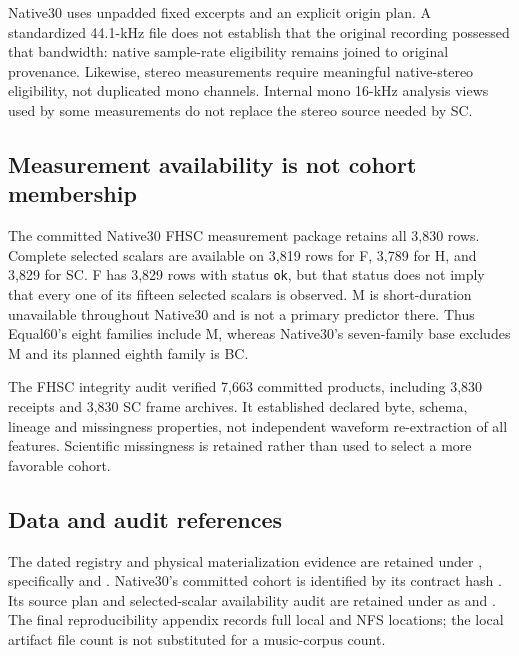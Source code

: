 Native30 uses unpadded fixed excerpts and an explicit origin plan. A standardized
44.1-kHz file does not establish that the original recording possessed that
bandwidth: native sample-rate eligibility remains joined to original provenance.
Likewise, stereo measurements require meaningful native-stereo eligibility,
not duplicated mono channels. Internal mono 16-kHz analysis views used by some
measurements do not replace the stereo source needed by SC.

\subsection{Measurement availability is not cohort membership}

The committed Native30 FHSC measurement package retains all 3,830 rows.
Complete selected scalars are available on 3,819 rows for F, 3,789 for H,
and 3,829 for SC. F has 3,829 rows with status \texttt{ok}, but that status
does not imply that every one of its fifteen selected scalars is observed.
M is short-duration unavailable throughout Native30 and is not a primary
predictor there. Thus Equal60's eight families include M, whereas Native30's
seven-family base excludes M and its planned eighth family is BC.

The FHSC integrity audit verified 7,663 committed products, including 3,830
receipts and 3,830 SC frame archives. It established declared byte, schema,
lineage and missingness properties, not independent waveform re-extraction of
all features. Scientific missingness is retained rather than used to select
a more favorable cohort.

\subsection{Data and audit references}

\begingroup\raggedright
The dated registry and physical materialization evidence are retained under
, specifically
 and
.
Native30's committed cohort is identified by its contract hash
.
Its source plan and selected-scalar availability audit are retained under
 as
 and
.
The final reproducibility appendix records full local and NFS locations;
the local artifact file count is not substituted for a music-corpus count.
\par\endgroup
